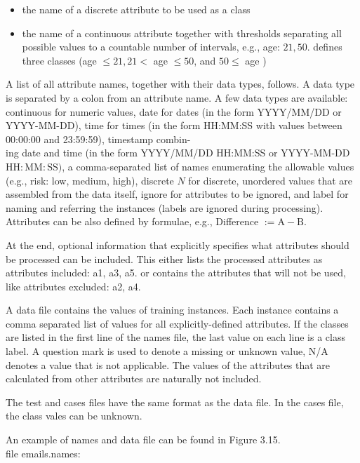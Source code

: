 \documentclass[10pt]{book}
\begin{document}
\begin{itemize}
  \item the name of a discrete attribute to be used as a class
  \item the name of a continuous attribute together with thresholds separating all possible values to a countable number of intervals, e.g., age: $21,50$. defines three classes (age $\leq 21,21<$ age $\leq 50$, and $50 \leq$ age )
\end{itemize}

A list of all attribute names, together with their data types, follows. A data type is separated by a colon from an attribute name. A few data types are available: continuous for numeric values, date for dates (in the form YYYY/MM/DD or YYYY-MM-DD), time for times (in the form HH:MM:SS with values between 00:00:00 and 23:59:59), timestamp combin-\\
ing date and time (in the form YYYY/MM/DD HH:MM:SS or YYYY-MM-DD $\mathrm{HH}: \mathrm{MM}: \mathrm{SS})$, a comma-separated list of names enumerating the allowable values (e.g., risk: low, medium, high), discrete $N$ for discrete, unordered values that are assembled from the data itself, ignore for attributes to be ignored, and label for naming and referring the instances (labels are ignored during processing). Attributes can be also defined by formulae, e.g., Difference $:=\mathrm{A}-\mathrm{B}$.

At the end, optional information that explicitly specifies what attributes should be processed can be included. This either lists the processed attributes as attributes included: a1, a3, a5. or contains the attributes that will not be used, like attributes excluded: a2, a4.

A data file contains the values of training instances. Each instance contains a comma separated list of values for all explicitly-defined attributes. If the classes are listed in the first line of the names file, the last value on each line is a class label. A question mark is used to denote a missing or unknown value, N/A denotes a value that is not applicable. The values of the attributes that are calculated from other attributes are naturally not included.

The test and cases files have the same format as the data file. In the cases file, the class vales can be unknown.

An example of names and data file can be found in Figure 3.15.\\
file emails.names:
\end{document}
